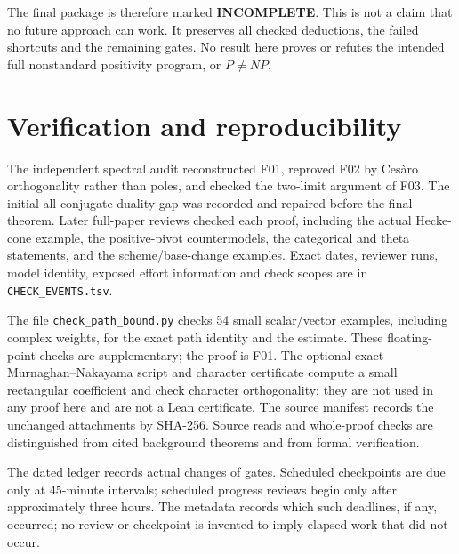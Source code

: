 \documentclass[11pt,a4paper]{article}
\theoremstyle{named}\newtheorem{finding}{Finding}[section]
\theoremstyle{definition}\newtheorem{definition}[finding]{Definition}
\theoremstyle{remark}\newtheorem{remark}[finding]{Remark}
\begin{document}
The final package is therefore marked \textbf{INCOMPLETE}. This is not a claim that no future approach can work. It preserves all checked deductions, the failed shortcuts and the remaining gates. No result here proves or refutes the intended full nonstandard positivity program, or $P\ne NP$.

\appendix
\section{Verification and reproducibility}
The independent spectral audit reconstructed F01, reproved F02 by Ces\`aro orthogonality rather than poles, and checked the two-limit argument of F03. The initial all-conjugate duality gap was recorded and repaired before the final theorem. Later full-paper reviews checked each proof, including the actual Hecke-cone example, the positive-pivot countermodels, the categorical and theta statements, and the scheme/base-change examples. Exact dates, reviewer runs, model identity, exposed effort information and check scopes are in \texttt{CHECK\_EVENTS.tsv}.

The file \texttt{check\_path\_bound.py} checks 54 small scalar/vector examples, including complex weights, for the exact path identity and the estimate. These floating-point checks are supplementary; the proof is F01. The optional exact Murnaghan--Nakayama script and character certificate compute a small rectangular coefficient and check character orthogonality; they are not used in any proof here and are not a Lean certificate. The source manifest records the unchanged attachments by SHA-256. Source reads and whole-proof checks are distinguished from cited background theorems and from formal verification.

The dated ledger records actual changes of gates. Scheduled checkpoints are due only at 45-minute intervals; scheduled progress reviews begin only after approximately three hours. The metadata records which such deadlines, if any, occurred; no review or checkpoint is invented to imply elapsed work that did not occur.
\end{document}
